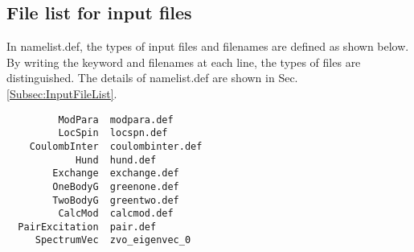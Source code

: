\subsection{File list for input files}
In namelist.def, the types of input files and filenames are defined as shown below.
By writing the keyword and filenames at each line, the types of files are distinguished.
The details of namelist.def are shown in Sec. \ref{Subsec:InputFileList}.
\\
\begin{minipage}{15cm}
\begin{screen}
\begin{verbatim}
         ModPara  modpara.def
         LocSpin  locspn.def
    CoulombInter  coulombinter.def
            Hund  hund.def
        Exchange  exchange.def
        OneBodyG  greenone.def
        TwoBodyG  greentwo.def
         CalcMod  calcmod.def
  PairExcitation  pair.def
     SpectrumVec  zvo_eigenvec_0
\end{verbatim}
\end{screen}
\end{minipage}

